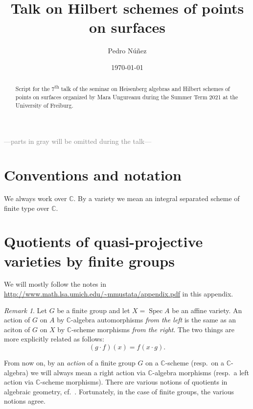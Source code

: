 \documentclass[12pt,a4paper]{amsart}
\title[Talk on Hilbert schemes of points on surfaces]{Talk on Hilbert schemes of points on surfaces}
\author[Pedro N\'{u}\~{n}ez]{Pedro N\'{u}\~{n}ez}
\date{\today}
\theoremstyle{plain}
\theoremstyle{definition}
\theoremstyle{remark}
\newtheorem{rem}[thm]{Remark}
\begin{document}
\maketitle

\begin{abstract}
  Script for the 7\textsuperscript{th} talk of the seminar on Heisenberg algebras and Hilbert schemes of points on surfaces organized by Mara Ungureanu during the Summer Term 2021 at the University of Freiburg.
\end{abstract}

\tableofcontents

\begin{center}
  \textcolor{gray}{---parts in gray will be omitted during the talk---}
\end{center}

\setcounter{section}{-1}

\section{Conventions and notation}

We always work over $\mathbb{C}$.
By a variety we mean an integral separated scheme of finite type over $\mathbb{C}$.

\appendix

\section{Quotients of quasi-projective varieties by finite groups}

We will mostly follow the notes in \url{http://www.math.lsa.umich.edu/~mmustata/appendix.pdf} in this appendix.

\begin{rem}
  Let $G$ be a finite group and let $X = \operatorname{Spec}{A}$ be an affine variety.
  An action of $G$ on $A$ by $\mathbb{C}$-algebra automorphisms \textit{from the left} is the same as an aciton of $G$ on $X$ by $\mathbb{C}$-scheme morphisms \textit{from the right}.
  The two things are more explicitly related as follows:
  \[ (g \cdot f)(x) = f(x \cdot g). \]
\end{rem}

From now on, by an \textit{action} of a finite group $G$ on a $\mathbb{C}$-scheme (resp.~on a $\mathbb{C}$-algebra) we will always mean a right action via $\mathbb{C}$-algebra morphisms (resp.~a left action via $\mathbb{C}$-scheme morphisms).
There are various notions of quotients in algebraic geometry, cf.~\cite[\S 0.1]{mfk94}.
Fortunately, in the case of finite groups, the various notions agree.
\end{document}
